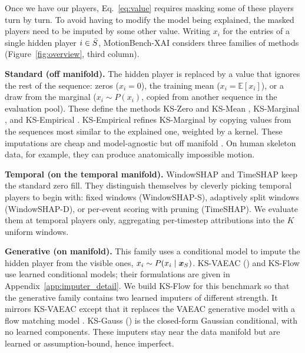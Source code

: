 Once we have our players, Eq.~\ref{eq:value} requires masking some of these players turn by turn. To avoid having to modify the model being explained, the masked players need to be imputed by some other value. Writing $x_i$ for the entries of a single hidden player $i \in \bar{S}$, MotionBench-XAI considers three families of methods (Figure~\ref{fig:overview}, third column). 

\textbf{Standard (off manifold).}  The hidden player is replaced by a value that ignores the rest of the sequence: zeros ($x_i = 0$), the training mean
($x_i = \mathbb{E}[x_i]$), or a draw from the marginal ($x_i \sim P(x_i)$,
copied from another sequence in the evaluation pool). These define the
methods KS-Zero and KS-Mean \citep{lundberg2017unified}, KS-Marginal \citep{aas2021explaining}, and KS-Empirical \citep{aas2021explaining,redelmeier2020explaining}. KS-Empirical refines KS-Marginal by copying values from the sequences most similar to the explained one, weighted by a kernel. These imputations are cheap and model-agnostic but off manifold \citep{frye2021shapley}. On human skeleton data, for example, they can produce anatomically impossible motion.

\textbf{Temporal (on the temporal manifold).} WindowSHAP
\citep{NAYEBI2023104438} and TimeSHAP \citep{bento2021timeshap} keep the
standard zero fill. They distinguish themselves by cleverly picking temporal players to begin with: fixed windows (WindowSHAP-S), adaptively split windows (WindowSHAP-D), or per-event scoring with pruning (TimeSHAP). We evaluate them at temporal players only, aggregating per-timestep attributions into the $K$ uniform windows.

\textbf{Generative (on manifold).}  This family uses a conditional model to impute the hidden player from the visible ones, $x_i \sim P(x_i \mid \bm{x}_{S})$. KS-VAEAC (\citealp{olsen2022using,ivanov2018variational}) and KS-Flow use learned conditional models; their formulations are given in
Appendix~\ref{app:imputer_detail}.
We build KS-Flow for this benchmark so that the generative family contains two learned imputers of different strength. It mirrors KS-VAEAC except that it replaces the VAEAC generative model with a flow matching model \citep{lipman2023flow}. KS-Gauss (\citealp{aas2021explaining}) is the closed-form Gaussian conditional, with no learned components. These imputers stay near the data manifold but are learned or assumption-bound, hence imperfect. %

